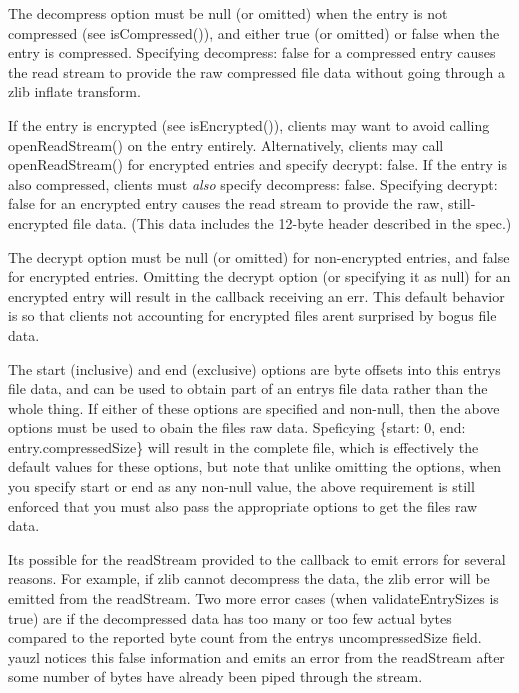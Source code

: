 The {\ttfamily decompress} option must be {\ttfamily null} (or omitted) when the entry is not compressed (see {\ttfamily is\+Compressed()}), and either {\ttfamily true} (or omitted) or {\ttfamily false} when the entry is compressed. Specifying {\ttfamily decompress\+: false} for a compressed entry causes the read stream to provide the raw compressed file data without going through a zlib inflate transform.

If the entry is encrypted (see {\ttfamily is\+Encrypted()}), clients may want to avoid calling {\ttfamily open\+Read\+Stream()} on the entry entirely. Alternatively, clients may call {\ttfamily open\+Read\+Stream()} for encrypted entries and specify {\ttfamily decrypt\+: false}. If the entry is also compressed, clients must {\itshape also} specify {\ttfamily decompress\+: false}. Specifying {\ttfamily decrypt\+: false} for an encrypted entry causes the read stream to provide the raw, still-\/encrypted file data. (This data includes the 12-\/byte header described in the spec.)

The {\ttfamily decrypt} option must be {\ttfamily null} (or omitted) for non-\/encrypted entries, and {\ttfamily false} for encrypted entries. Omitting the {\ttfamily decrypt} option (or specifying it as {\ttfamily null}) for an encrypted entry will result in the {\ttfamily callback} receiving an {\ttfamily err}. This default behavior is so that clients not accounting for encrypted files aren\textquotesingle{}t surprised by bogus file data.

The {\ttfamily start} (inclusive) and {\ttfamily end} (exclusive) options are byte offsets into this entry\textquotesingle{}s file data, and can be used to obtain part of an entry\textquotesingle{}s file data rather than the whole thing. If either of these options are specified and non-\/{\ttfamily null}, then the above options must be used to obain the file\textquotesingle{}s raw data. Speficying {\ttfamily \{start\+: 0, end\+: entry.\+compressed\+Size\}} will result in the complete file, which is effectively the default values for these options, but note that unlike omitting the options, when you specify {\ttfamily start} or {\ttfamily end} as any non-\/{\ttfamily null} value, the above requirement is still enforced that you must also pass the appropriate options to get the file\textquotesingle{}s raw data.

It\textquotesingle{}s possible for the {\ttfamily read\+Stream} provided to the {\ttfamily callback} to emit errors for several reasons. For example, if zlib cannot decompress the data, the zlib error will be emitted from the {\ttfamily read\+Stream}. Two more error cases (when {\ttfamily validate\+Entry\+Sizes} is {\ttfamily true}) are if the decompressed data has too many or too few actual bytes compared to the reported byte count from the entry\textquotesingle{}s {\ttfamily uncompressed\+Size} field. yauzl notices this false information and emits an error from the {\ttfamily read\+Stream} after some number of bytes have already been piped through the stream.

